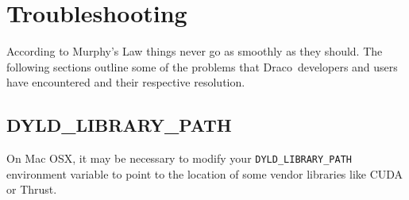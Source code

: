 \documentclass[11pt]{nmemo}
\newcommand{\comp}[1]{\normalfont\footnotesize\texttt{#1}\normalsize}
\newcommand{\draco}{{\normalfont\sffamily Draco}}
\newcommand{\svn}{{\normalfont\bfseries SVN}}
\begin{document}

\section{Troubleshooting}

According to Murphy's Law things never go as smoothly as they should.
The following sections outline some of the problems that
\draco\ developers and users have encountered and their respective
resolution.

\subsection{DYLD\_LIBRARY\_PATH}

On Mac OSX, it may be necessary to modify your
\comp{DYLD\_LIBRARY\_PATH} environment variable to point to the
location of some vendor libraries like CUDA or Thrust.






\end{document}
